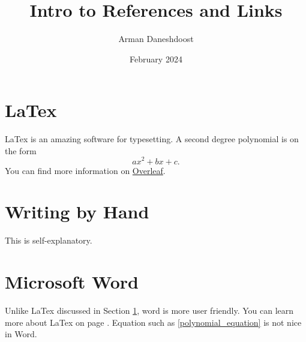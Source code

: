 \documentclass{article}
\title{Intro to References and Links}
\author{Arman Daneshdoost}
\date{February 2024}
\begin{document}
	\maketitle
	\tableofcontents
	\section{LaTex} \label{Latex-section}
	LaTex is an amazing software for typesetting. A second degree polynomial is on the form
	\begin{equation} \label{polynomial_equation}  %
		ax^{2} + bx + c.
	\end{equation}
	You can find more information on \href{www.overleaf.com}{Overleaf}. %
	\section{Writing by Hand}
	This is self-explanatory.
	\newpage %
	\section{Microsoft Word}
	Unlike LaTex discussed in Section \ref{Latex-section}, word is more user friendly. You can learn more about LaTex on page
	\pageref{Latex-section}. Equation such as \eqref{polynomial_equation} is not nice in Word.
		
\end{document}
